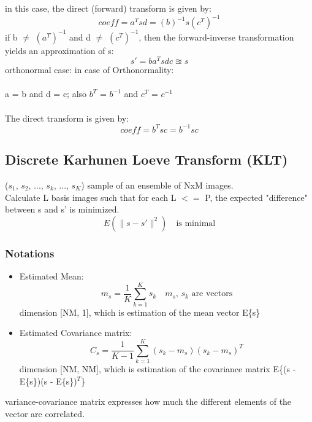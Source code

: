 \documentclass{article}
\begin{document}
in this case, the direct (forward) transform is given by:
\begin{equation}
    coeff = a^T s d = (b)^{-1} s (c^T)^{-1}
\end{equation}
if b $\neq$ $(a^T)^{-1}$ and d $\neq$ $(c^T)^{-1}$, then the forward-inverse transformation yields an approximation of s:
\begin{equation}
    s' = b a^T s d c \approxeq s
\end{equation}
orthonormal case:
in case of Orthonormality:\\
\\
a = b and d = c; also $b^T$ = $b^{-1}$ and $c^T$ = $c^{-1}$ \\
\\
The direct transform is given by:
\begin{equation}
    coeff = b^T s c = b^{-1} s c
\end{equation}
\pagebreak
\subsection{Discrete Karhunen Loeve Transform (KLT)}
($s_1$, $s_2$, ..., $s_k$, ..., $s_K$) sample of an ensemble of NxM images. \\
Calculate L basis images such that for each L $<=$ P, the expected "difference" between s and s' is minimized. \\
\begin{equation}
    E\left( \lVert s - s' \rVert^2 \right) \quad \textrm{is minimal}
\end{equation}
\subsubsection{Notations}
\begin{itemize}
    \item Estimated Mean: \\ \begin{equation}
        m_s = \frac{1}{K} \sum_{k=1}^{K} s_k \quad \textrm{$m_s$, $s_k$ are vectors}
    \end{equation}
    dimension [NM, 1], which is estimation of the mean vector E\{s\}
    \item Estimated Covariance matrix: \\ \begin{equation}
        C_s = \frac{1}{K-1} \sum_{k=1}^{K} (s_k - m_s)(s_k - m_s)^T
    \end{equation}
    dimension [NM, NM], which is estimation of the covariance matrix E\{(s - E\{s\})(s - E\{s\})$^T$\}
\end{itemize}
variance-covariance matrix expresses how much the different elements of the vector are correlated. \\
\end{document}
